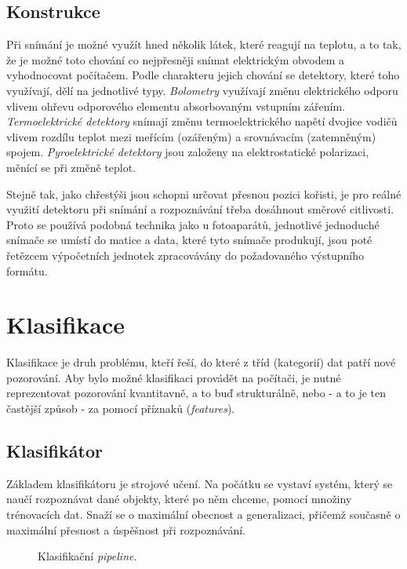 \documentclass[10pt,a4paper]{article}
\begin{document}
  \subsection{Konstrukce}
  Při snímání je možné využít hned několik látek, které reagují na teplotu, a to tak, že je možné
  toto chování co nejpřesněji snímat elektrickým obvodem a vyhodnocovat počítačem. Podle
  charakteru jejich chování se detektory, které toho využívají, dělí na jednotlivé typy.
  {\it Bolometry} využívají změnu elektrického odporu vlivem ohřevu odporového elementu
  absorbovaným vstupním zářením. {\it Termoelektrické detektory} snímají změnu termoelektrického
  napětí dvojice vodičů vlivem rozdílu teplot mezi meřícím (ozářeným) a srovnávacím (zatemněným)
  spojem. {\it Pyroelektrické detektory} jsou založeny na elektrostatické polarizaci, měnící se při
  změně teplot. \cite{DetectorsBook}

  Stejně tak, jako chřestýši jsou schopni určovat přesnou pozici kořisti, je pro reálné využití detektoru
  při snímání a rozpoznávání třeba dosáhnout směrové citlivosti. Proto se používá podobná technika jako
  u fotoaparátů, jednotlivé jednoduché snímače se umístí do matice a data, které tyto snímače produkují,
  jsou poté řetězcem výpočetních jednotek zpracovávány do požadovaného výstupního formátu.
  
  \section{Klasifikace}
  Klasifikace je druh problému, kteří řeší, do které z tříd (kategorií) dat patří nové pozorování.
  Aby bylo možné klasifikaci provádět na počítači, je nutné reprezentovat pozorování kvantitavně,
  a to buď strukturálně, nebo - a to je ten častější způsob - za pomocí příznaků ({\it features}).

  \subsection{Klasifikátor}
  Základem klasifikátoru je strojové učení. Na počátku se vystaví systém, který se naučí rozpoznávat
  dané objekty, které po něm chceme, pomocí množiny trénovacích dat. Snaží se o maximální obecnost
  a generalizaci, přičemž současně o maximální přesnost a úspěšnost při rozpoznávání.

  \begin{figure}[h!]
    \begin{center}
      \caption[title=Obrazek]{Klasifikační {\it pipeline}.\label{fig:classification}}
    \end{center}    
  \end{figure}
\end{document}
